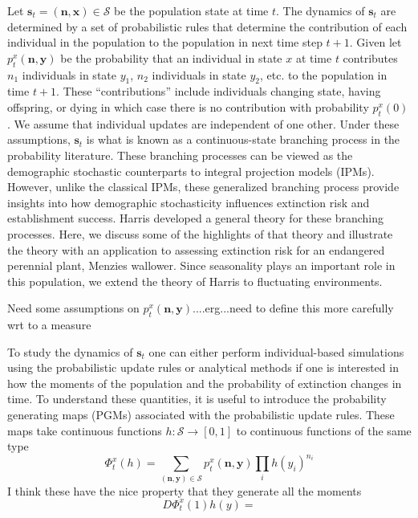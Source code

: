 \documentclass{amsart}
\def\S{\mathcal S}
\def\n{\mathbf n}
\def\s{\mathbf s}
\def\x{\mathbf x}
\def\y{\mathbf y}
\begin{document}
Let  $\s_t=( \n, \x)\in \S$ be the population state at time $t$. The dynamics of $\s_t$ are determined by a set of probabilistic rules that determine the contribution of each individual in the population to the population in next time step $t+1$. Given let $p_t^x(\n,\y)$ be the probability that an individual in state $x$ at time $t$ contributes $n_1$ individuals in state $y_1$, $n_2$ individuals in state $y_2$, etc. to the population in time $t+1$. These ``contributions'' include individuals changing state, having offspring, or dying in which case there is no contribution with probability $p_t^x(0)$. We assume that individual updates are independent of one other. Under these assumptions, $\s_t$ is what is known as a continuous-state branching process in the probability literature.  These branching processes can be viewed as the demographic stochastic counterparts to integral projection models (IPMs). However, unlike the classical IPMs, these generalized branching process provide insights into how demographic stochasticity influences extinction risk and establishment success. Harris developed a general theory for these branching processes. Here, we discuss some of the highlights of that theory and illustrate the theory with an application to assessing extinction risk for an endangered perennial plant, Menzies wallower.   Since seasonality plays an important role in this population, we extend the theory of Harris to fluctuating environments.

Need some assumptions on $p_t^x(\n,\y)$....erg...need to define this more carefully wrt to a measure


To study the dynamics of $\s_t$ one can either perform individual-based simulations using the probabilistic update rules or analytical methods if one is interested in how the moments of the population and the probability of extinction changes in time. To understand these quantities, it is useful to introduce the probability generating maps (PGMs) associated with the probabilistic update rules. These maps take continuous functions $h:\S\to [0,1]$ to continuous functions of the same type 
\[
\Phi^x_t(h) = \sum_{(\n, \y)\in \S} p_t^x(\n,\y) \prod_i h(y_i)^{n_i}
\]
I think these have the nice property that they generate all the moments
\[
D\Phi_t^x (1)h(y) = 
\]
\end{document}
